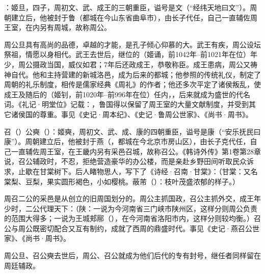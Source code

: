 ：姬旦，四子，周初文、武、成王的三朝重臣，谥号是文（“经纬天地曰文”）。周朝建立后，他被封于鲁（都城在今山东省曲阜市），由长子代任，自己一直辅佐周王室，在内另有周城，故称周公。

周公旦具有高尚的品德，卓越的才能，是孔子倾心仰慕的大。武王有疾，周公设坛祭祖，情愿以身相代。武王去世后，继位的（姬诵，前1042年--前1021年在位）年少，周公摄政当国，威仪如君；7年后还政成王，恭敬称臣。成王患病，周公又祷神自代。他和主持营建的新城洛邑，成为后来的都城；他参照的传统礼仪，制定了周朝的礼乐制度，相传是儒家经典《周礼》的作者；他还多次平定了诸侯叛乱，使成王及随后的（姬钊，前1020年--前996年在位）任内，，后来就成为盛世的代名词。《礼记·明堂位》记载：，鲁国得以保留了周王室的大量文献制度，并受到其它诸侯国的尊重。事见《史记·周本纪》、《史记·鲁周公世家》、《尚书·周书》。

召（）公奭（）：姬奭，周初文、武、成、康的四朝重臣，谥号是康（“安乐抚民曰康”）。周朝建立后，他被封于燕（，都城在今北京市房山区），由长子克代任，自己一直辅佐周王室，在王畿内另有采邑召城，故称召公。《韩诗外传》第1卷第28章说，召公辅政时，不忍，拒绝营造豪华的办公楼，而是亲赴乡野田间听取民众诉求，止歇在甘棠树下。后人睹物思人，写下了《诗经·召南·甘棠》：（甘棠：又名棠梨、豆梨，果实圆形褐色，小如樱桃。蔽芾（）：枝叶茂盛浓郁的样子。）

周召二公的采邑是从创立的旧周国划分的。周公主抓国政，召公主抓外交，成王年少时，二公代理天下：（陕：一说为今河南省三门峡市陕州区，这样分则周公负责的范围大得多；一说为王城郏鄏（），在今河南省洛阳市内，这样分则较均衡。）召公与周公既密切配合又互有制约，成就了西周的鼎盛时代。事见《史记·燕召公世家》、《尚书·周书》。

周公旦、召公奭去世后，周公、召公就成为他们后代的专有封号，继任者同样留在周廷辅政。%


